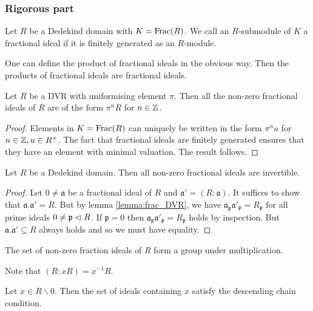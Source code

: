 \documentclass{memoir}
\begin{document}
\subsubsection{Rigorous part}
\begin{definition}
    Let $R$ be a Dedekind domain with $K=\text{Frac}(R)$.
    We call an $R$-submodule of $K$ a fractional ideal if it is finitely generated as an $R$-module.
\end{definition}
\begin{remark}
    One can define the product of fractional ideals in the obvious way.
    Then the products of fractional ideals are fractional ideals.
\end{remark}
\begin{lemma}
    \label{lemma:frac_DVR}
    Let $R$ be a DVR with uniformising element $\pi$. 
    Then all the non-zero fractional ideals of $R$ are of the form $\pi^nR$ for $n\in \mathbb{Z}$.
\end{lemma}
\begin{proof}
    Elements in $K = \text{Frac}(R)$ can uniquely be written in the form $\pi^nu$ for $n\in\mathbb{Z},u\in R^\times$.
    The fact that fractional ideals are finitely generated ensures that they have an element with minimal valuation.
    The result follows.
\end{proof}
\begin{thm}
    Let $R$ be a Dedekind domain. 
    Then all non-zero fractional ideals are invertible.
\end{thm}
\begin{proof}
    Let $0\ne \mathfrak a$ be a fractional ideal of $R$ and $\mathfrak a' = (R:\mathfrak a)$.
    It suffices to show that $\mathfrak a . \mathfrak a' = R$.
    But by lemma \ref{lemma:frac_DVR}, we have $\mathfrak a_{\mathfrak p} \mathfrak a'_{\mathfrak p} = R_{\mathfrak p}$ for all prime ideals $0\ne \mathfrak p \vartriangleleft R$.
    If $\mathfrak p = 0$ then $\mathfrak a_{\mathfrak p} \mathfrak a'_{\mathfrak p} = R_{\mathfrak p}$ holds by inspection.
    But $\mathfrak a . \mathfrak a' \subseteq R$ always holds and so we must have equality.
\end{proof}
\begin{corollary}
    The set of non-zero fraction ideals of $R$ form a group under multiplication.
\end{corollary}
\begin{remark}
    Note that $(R:xR) = x^{-1}R$.
\end{remark}
\begin{lemma}
    \label{lemma:DCC}
    Let $x\in R\backslash 0$. Then the set of ideals containing $x$ satisfy the descending chain condition.
\end{lemma}
\end{document}
